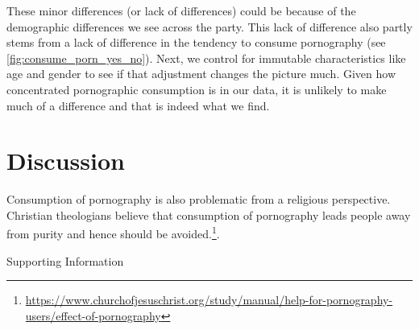 \documentclass[12pt, letterpaper]{article}
\begin{document}
\newpage

These minor differences (or lack of differences) could be because of the demographic differences we see across the party. This lack of difference also partly stems from a lack of difference in the tendency to consume pornography (see \cref{fig:consume_porn_yes_no}). Next, we control for immutable characteristics like age and gender to see if that adjustment changes the picture much. Given how concentrated pornographic consumption is in our data, it is unlikely to make much of a difference and that is indeed what we find. 



\section*{Discussion}
Consumption of pornography is also problematic from a religious perspective. Christian theologians believe that consumption of pornography leads people away from purity and hence should be avoided.\footnote{\url{https://www.churchofjesuschrist.org/study/manual/help-for-pornography-users/effect-of-pornography}}.
\clearpage


\clearpage

\appendix
\renewcommand{\thesection}{SI \arabic{section}}
\renewcommand\thetable{\thesection.\arabic{table}}  
\renewcommand\thefigure{\thesection.\arabic{figure}}
\begin{center}
\Large{Supporting Information}
\end{center}

\FloatBarrier
\end{document}
